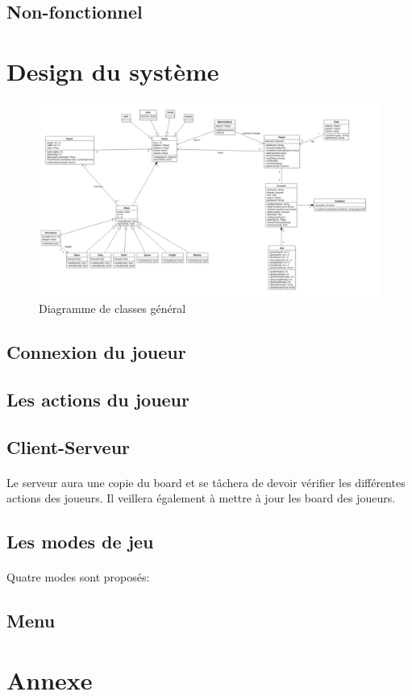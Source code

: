\documentclass[10pt, a4paper]{article}
\begin{document}
		\subsection{Non-fonctionnel}
		
	\section{Design du système}
	
\begin{figure}[h]
\centering
\includegraphics[scale=0.45]{ClassDiagram.png}
\caption{Diagramme de classes général}
\label{CD} %
\end{figure}
		
		\subsection{Connexion du joueur}
		
		\subsection{Les actions du joueur}
		
		\subsection{Client-Serveur}
		\paragraph{}Le serveur aura une copie du board et se tâchera de devoir vérifier les différentes actions des joueurs. Il veillera également à  mettre à jour les board des joueurs.
		\subsection{Les modes de jeu}
		\paragraph{}Quatre modes sont proposés:
		
		\subsection{Menu}
		
	\section{Annexe}
	
	
		
		
		
		
\end{document}
